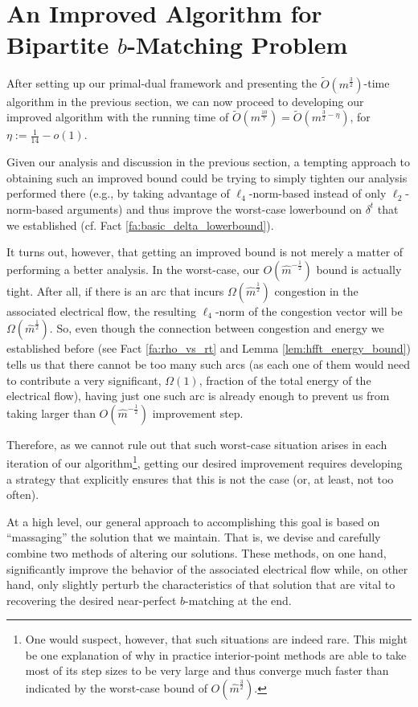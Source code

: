 \documentclass[11pt, letterpaper]{article}
\newcommand{\tO}[1]{\widetilde{O}(#1)}
\newcommand{\hm}{\widehat{m}}
\newcommand{\cm}{{m}}
\newcommand{\bb}{\boldsymbol{\mathit{b}}}
\begin{document}
  \section{An Improved Algorithm for Bipartite $\bb$-Matching Problem}
\label{sec:improved}

After setting up our primal-dual framework and presenting the $\tO{\cm^{\frac{3}{2}}}$-time algorithm in the previous section, we can now proceed to developing our improved algorithm with the running time of $\tO{\cm^{\frac{10}{7}}}=\tO{\cm^{\frac{3}{2}-\eta}}$, for $\eta:=\frac{1}{14}-o(1)$.

Given our analysis and discussion in the previous section, a tempting approach to obtaining such an improved bound could be trying to simply tighten our analysis performed there (e.g., by taking advantage of $\ell_4$-norm-based instead of only $\ell_2$-norm-based arguments) and thus improve the worst-case lowerbound on $\delta^{t}$ that we established (cf. Fact \ref{fa:basic_delta_lowerbound}). 

It turns out, however, that getting an improved bound is not merely a matter of performing a better analysis. In the worst-case, our $O(\hm^{-\frac{1}{2}})$ bound is actually tight. After all, if there is an arc that incurs $\Omega(\hm^{\frac{1}{2}})$ congestion in the associated electrical flow, the resulting $\ell_4$-norm of the congestion vector will be $\Omega(\hm^{\frac{1}{2}})$. So, even though the connection between congestion and energy we established before (see Fact \ref{fa:rho_vs_rt} and Lemma \ref{lem:hfft_energy_bound}) tells us that there cannot be too many such arcs (as each one of them would need to contribute a very significant, $\Omega(1)$, fraction of the total energy of the electrical flow), having just one such arc is already enough to prevent us from taking larger than $O(\hm^{-\frac{1}{2}})$ improvement step. 

Therefore, as we cannot rule out that such worst-case situation arises in each iteration of our algorithm\footnote{One would suspect, however, that such situations are indeed rare. This might be one explanation of why in practice interior-point methods are able to take most of its step sizes to be very large and thus converge much faster than indicated by the worst-case bound of $O(\hm^{\frac{3}{2}})$.}, getting our desired improvement requires developing a strategy that explicitly ensures that this is not the case (or, at least, not too often). 

At a high level, our general approach to accomplishing this goal is based on ``massaging'' the solution that we maintain. That is, we devise and carefully combine two methods of altering our solutions. These methods, on one hand, significantly improve the behavior of the associated electrical flow while, on other hand, only slightly perturb the characteristics of that solution that are vital to recovering the desired near-perfect $\bb$-matching at the end.
\end{document}
